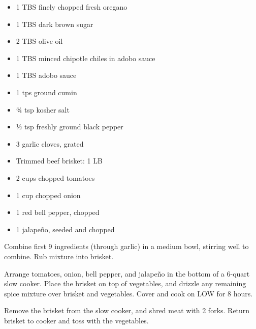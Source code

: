 \fromMom

\ingredients
\begin{itemize}
\item
  1 TBS finely chopped fresh oregano
\item
  1 TBS dark brown sugar
\item
  2 TBS olive oil
\item
  1 TBS minced chipotle chiles in adobo sauce
\item
  1 TBS adobo sauce
\item
  1 tps ground cumin
\item
  ¾ tsp kosher salt
\item
  ½ tsp freshly ground black pepper
\item
  3 garlic cloves, grated
\item
  Trimmed beef brisket: 1 LB
\item
  2 cups chopped tomatoes
\item
  1 cup chopped onion
\item
  1 red bell pepper, chopped
\item
  1 jalapeño, seeded and chopped
\end{itemize}

\instructions

Combine first 9 ingredients (through garlic) in a medium bowl, stirring
well to combine. Rub mixture into brisket.

Arrange tomatoes, onion, bell pepper, and jalapeño in the bottom of a
6-quart slow cooker. Place the brisket on top of vegetables, and drizzle
any remaining spice mixture over brisket and vegetables. Cover and cook
on LOW for 8 hours.

Remove the brisket from the slow cooker, and shred meat with 2 forks.
Return brisket to cooker and toss with the vegetables.
